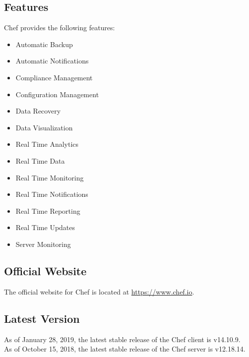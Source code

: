 \documentclass[a4paper, 12pt]{article}
\begin{document}
\newpage
\subsection{Features}
Chef provides the following features:
\begin{itemize}
\item
Automatic Backup
\item
Automatic Notifications
\item
Compliance Management
\item
Configuration Management
\item
Data Recovery
\item
Data Visualization
\item
Real Time Analytics
\item
Real Time Data
\item
Real Time Monitoring
\item
Real Time Notifications
\item
Real Time Reporting
\item
Real Time Updates
\item
Server Monitoring

\end{itemize}

\subsection{Official Website}
The official website for Chef is located at \href{https://www.chef.io}{https://www.chef.io}.
\subsection{Latest Version}
As of January 28, 2019, the latest stable release of the Chef client is v14.10.9.\\
As of October 15, 2018, the latest stable release of the Chef server is v12.18.14.
\end{document}
